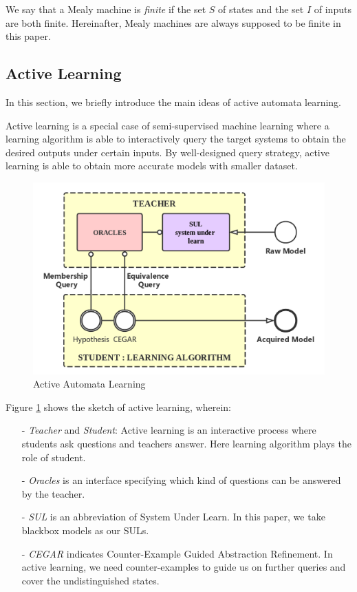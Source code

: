 \documentclass[conference, a4paper]{IEEEtran}
\begin{document}
We say that a Mealy machine is \emph{finite} if the set $S$ of states and the set $I$ of inputs are
both finite. Hereinafter, Mealy machines are always supposed to be finite in this paper.


\subsection{Active Learning}
In this section, we briefly introduce the main ideas of active automata learning. 

Active learning \cite{settles2010active} is a special case of semi-supervised machine learning where
a learning algorithm is able to interactively query the target systems to obtain the desired outputs
under certain inputs. By well-designed query strategy, active learning is able to obtain more
accurate models with smaller dataset. 

\begin{figure}[ht]
  \begin{center}
    \includegraphics[width=.5\textwidth]{./images/activelearning.png}
  \end{center}
  \caption{Active Automata Learning}
  \label{fig:activelearning}
\end{figure}

Figure \ref{fig:activelearning} shows the sketch of active learning, wherein:
\begin{itemize}
  \item[-] \emph{Teacher} and \emph{Student}: Active learning is an interactive process where
    students ask questions and teachers answer. Here learning algorithm plays the role of student.
  \item[-] \emph{Oracles} is an interface specifying which kind of questions can be answered by the
    teacher.
  \item[-] \emph{SUL} is an abbreviation of System Under Learn. In this paper, we take blackbox
    models as our SULs.
  \item[-] \emph{CEGAR} indicates Counter-Example Guided Abstraction
    Refinement\cite{DBLP:conf/cav/ClarkeGJLV00}. In active learning, we need counter-examples to
    guide us on further queries and cover the undistinguished states.
\end{itemize}
\end{document}
